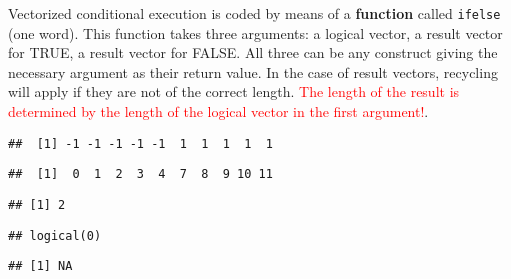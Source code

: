 \documentclass[paper=a4,headsepline,BCOR=12mm,twoside,open=right,%
titlepage,headings=small,fontsize=10pt,index=totoc,bibliography=totoc,%
captions=tableheading,captions=nooneline]{scrbook}\usepackage{knitr}
\begin{document}
Vectorized conditional execution is coded by means of a \textbf{function} called \texttt{ifelse} (one word). This function takes three arguments: a logical vector, a result vector for TRUE, a result vector for FALSE. All three can be any construct giving the necessary argument as their return value. In the case of result vectors, recycling will apply if they are not of the correct length. \textcolor{red}{The length of the result is determined by the length of the logical vector in the first argument!}.

\begin{knitrout}\footnotesize
{}\color{fgcolor}\begin{kframe}
\begin{alltt}
 \hlkwb{<-} \hlopt{:}
 \hlopt{>} \hlstd{,} \hlstd{,} \hlopt{-}\hlstd{)}
\end{alltt}
\begin{verbatim}
##  [1] -1 -1 -1 -1 -1  1  1  1  1  1
\end{verbatim}
\begin{alltt}
 \hlopt{>}  \hlopt{+}  \hlopt{-} \hlstd{)}
\end{alltt}
\begin{verbatim}
##  [1]  0  1  2  3  4  7  8  9 10 11
\end{verbatim}
\begin{alltt}
\hlstd{(}\hlopt{>} \hlopt{+}  \hlopt{-} \hlstd{)} 
\end{alltt}
\begin{verbatim}
## [1] 2
\end{verbatim}
\begin{alltt}
\hlstd{(}\hlstd{(} \hlopt{+}  \hlopt{-} \hlstd{)} 
\end{alltt}
\begin{verbatim}
## logical(0)
\end{verbatim}
\begin{alltt}
\hlstd{(} \hlopt{+}  \hlopt{-} \hlstd{)} 
\end{alltt}
\begin{verbatim}
## [1] NA
\end{verbatim}
\end{kframe}
\end{knitrout}
\end{document}
